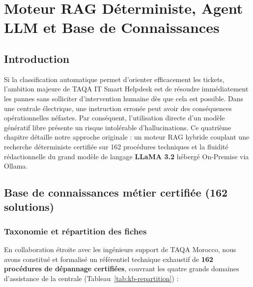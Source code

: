 \documentclass[12pt, a4paper, oneside]{report}
\begin{document}
\newpage
\chapter{Moteur RAG Déterministe, Agent LLM et Base de Connaissances}

\section{Introduction}

Si la classification automatique permet d'orienter efficacement les tickets, l'ambition majeure de TAQA IT Smart Helpdesk est de résoudre immédiatement les pannes sans solliciter d'intervention humaine dès que cela est possible. Dans une centrale électrique, une instruction erronée peut avoir des conséquences opérationnelles néfastes. Par conséquent, l'utilisation directe d'un modèle génératif libre présente un risque intolérable d'hallucinations. Ce quatrième chapitre détaille notre approche originale : un moteur RAG hybride couplant une recherche déterministe certifiée sur 162 procédures techniques et la fluidité rédactionnelle du grand modèle de langage \textbf{LLaMA 3.2} hébergé On-Premise via Ollama.

\section{Base de connaissances métier certifiée (162 solutions)}

\subsection{Taxonomie et répartition des fiches}

En collaboration étroite avec les ingénieurs support de TAQA Morocco, nous avons constitué et formalisé un référentiel technique exhaustif de \textbf{162 procédures de dépannage certifiées}, couvrant les quatre grands domaines d'assistance de la centrale (Tableau~\ref{tab:kb-repartition}) :
\end{document}
